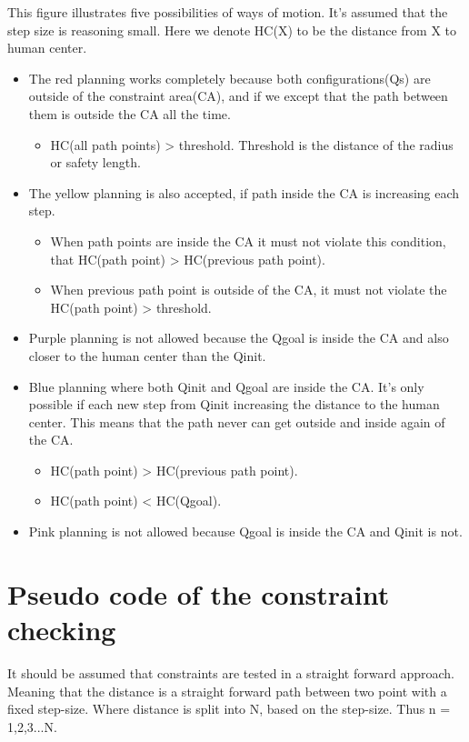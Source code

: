 This figure illustrates five possibilities of ways of motion. It's assumed that the step size is reasoning small. 
Here we denote HC(X) to be the distance from X to human center.
\begin{itemize}
\item The red planning works completely because both configurations(Qs) are outside of the constraint area(CA), and if we except that the path between them is outside the CA all the time. 
	\begin{itemize}
	\item HC(all path points) > threshold. Threshold is the distance of the radius or safety length. 
	\end{itemize} 
\item The yellow planning is also accepted, if path inside the CA is increasing each step. 
	\begin{itemize}
	\item When path points are inside the CA it must not violate this condition, 
	that HC(path point) > HC(previous path point).
	\item When previous path point is outside of the CA, it must not violate the 
	HC(path point) > threshold.
	\end{itemize}
\item Purple planning is not allowed because the Qgoal is inside the CA and also closer to the human center than the Qinit.
\item Blue planning where both Qinit and Qgoal are inside the CA. It's only possible if each new step from Qinit increasing the distance to the human center. This means that the path never can get outside and inside again of the CA.
	\begin{itemize}
	\item  HC(path point) >  HC(previous path point).
	\item  HC(path point) <  HC(Qgoal).
	\end{itemize} 
\item Pink planning is not allowed because Qgoal is inside the CA and Qinit is not.
\end{itemize}

\section{Pseudo code of the constraint checking}
It should be assumed that constraints are tested in a straight forward approach. Meaning that the distance is a straight forward path between two point with a fixed step-size. Where distance is split into N, based on the step-size. Thus n = 1,2,3...N.

